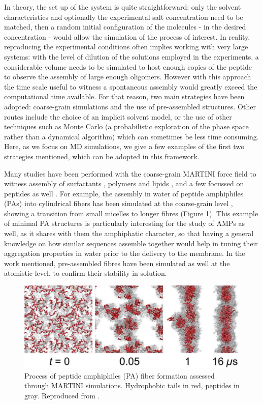 In theory, the set up of the system is quite straightforward: only the solvent characteristics and optionally the experimental salt concentration need to be matched, then a random initial configuration of the molecules - in the desired concentration - would allow the simulation of the process of interest.
%
In reality, reproducing the experimental conditions often implies working with very large systems: with the level of dilution of the solutions employed in the experiments, a considerable volume needs to be simulated to host enough copies of the peptide to observe the assembly of large enough oligomers.
%
However with this approach the time scale useful to witness a spontaneous assembly would greatly exceed the computational time available. For that reason, two main strategies have been adopted: coarse-grain simulations and the use of pre-assembled structures. Other routes include the choice of an implicit solvent model, or the use of other techniques such as Monte Carlo (a probabilistic exploration of the phase space rather than a dynamical algorithm) which can sometimes be less time consuming. Here, as we focus on MD simulations, we give a few examples of the first two strategies mentioned, which can be adopted in this framework.

Many studies have been performed with the coarse-grain MARTINI force field to witness assembly of surfactants \citep{Wu2012}, polymers \citep{Wang2012poly,Bochicchio2017} and lipids \citep{Lee2011,Brocos2012}, and a few focussed on peptides as well \citep{Guo2012,Seo2012}.
%
For example, the assembly in water of peptide amphiphiles (PAs) into cylindrical fibers has been simulated at the coarse-grain level \citep{Lee2012}, showing a transition from small micelles to longer fibres (Figure \ref{fig:PA}). This example of minimal PA structures is particularly interesting for the study of AMPs as well, as it shares with them the amphiphatic character, so that having a general knowledge on how similar sequences assemble together would help in tuning their aggregation properties in water prior to the delivery to the membrane.
%
In the work mentioned, pre-assembled fibres have been simulated as well at the atomistic level, to confirm their stability in solution.
%
\begin{figure}[t!]
\centering
\includegraphics[width=0.8\linewidth]{2methods/pics/PA.jpeg}
%
\caption[Peptide amphiphiles assembly through MARTINI simulations]{Process of peptide amphiphiles (PA) fiber formation assessed through MARTINI simulations. Hydrophobic tails in red, peptides in gray. Reproduced from \citet{Lee2012}.}
\label{fig:PA}
\end{figure}

